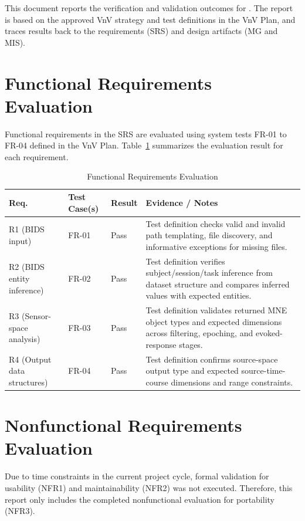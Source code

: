 \documentclass[12pt, titlepage]{article}
\begin{document}
This document reports the verification and validation outcomes for \progname{}.
The report is based on the approved VnV strategy and test definitions in the VnV Plan, and traces results back to the requirements (SRS) and design artifacts (MG and MIS).

\section{Functional Requirements Evaluation}

Functional requirements in the SRS are evaluated using system tests FR-01 to FR-04 defined in the VnV Plan.
Table~\ref{tab:fr_eval} summarizes the evaluation result for each requirement.

\begin{table}[h]
\centering
\begin{tabularx}{\textwidth}{p{1.8cm}p{2.2cm}p{2.2cm}X}
\toprule
\textbf{Req.} & \textbf{Test Case(s)} & \textbf{Result} & \textbf{Evidence / Notes}\\
\midrule
R1 (BIDS input) & FR-01 & Pass & Test definition checks valid and invalid path templating, file discovery, and informative exceptions for missing files.\\
R2 (BIDS entity inference) & FR-02 & Pass & Test definition verifies subject/session/task inference from dataset structure and compares inferred values with expected entities.\\
R3 (Sensor-space analysis) & FR-03 & Pass & Test definition validates returned MNE object types and expected dimensions across filtering, epoching, and evoked-response stages.\\
R4 (Output data structures) & FR-04 & Pass & Test definition confirms source-space output type and expected source-time-course dimensions and range constraints.\\
\bottomrule
\end{tabularx}
\caption{Functional Requirements Evaluation}
\label{tab:fr_eval}
\end{table}

\section{Nonfunctional Requirements Evaluation}

\noindent Due to time constraints in the current project cycle, formal validation for usability (NFR1) and maintainability (NFR2) was not executed. Therefore, this report only includes the completed nonfunctional evaluation for portability (NFR3).
\end{document}
